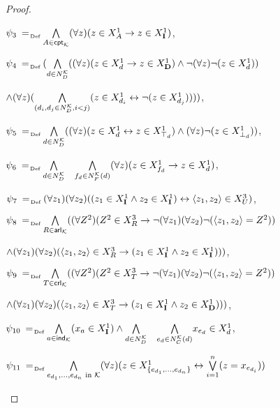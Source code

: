 \documentclass[a4paper]{llncs}
\newcommand{\defAs}{\mathrel{\makebox{\:= \hspace{-.2cm} \raisebox{-0.5 ex}[0 ex][0 ex]{\tiny Def}}}}
\newcommand{\I}{\mathbf{I}}
\newcommand{\D}{\mathbf{D}}
\newcommand{\ck}{\mathsf{cpt}_\mathcal{K}}
\newcommand{\ark}{\mathsf{arl}_\mathcal{K}}
\newcommand{\crk}{\mathsf{crl}_\mathcal{K}}
\newcommand{\ik}{\mathsf{ind}_\mathcal{K}}
\begin{document}
\begin{proof}
\begin{itemize}
{\item[-] $\psi_3 \defAs \underset{A \in \ck}\bigwedge (\forall z)(z \in X_{A}^1 \rightarrow z \in X_{\I}^1)$,

\item[-] $\psi_4 \defAs ( \underset{d \in N_{D}^\mathcal{K}}\bigwedge((\forall z)(z \in X_{d}^1 \rightarrow z \in X_{\D}^1) \wedge \neg (\forall z)\neg(z \in X_{d}^1))$

$\hfill \wedge (\forall z) (\underset{(d_i,d_j \in N_{D}^\mathcal{K}, i < j)}\bigwedge (z \in X_{d_i}^1 \leftrightarrow \neg (z \in X_{d_j}^1))))$,

\item[-] $\psi_5 \defAs \underset{d \in N_{D}^\mathcal{K}}\bigwedge((\forall z)(z \in X_{d}^1 \leftrightarrow z \in X_{\top_d}^1) \wedge (\forall z)\neg(z \in X_{\bot_d}^1))$,

\item[-] $\psi_6 \defAs \underset{d \in N_{D}^\mathcal{K}} \bigwedge  \quad \underset {f_d \in N_{F}^\mathcal{K}(d)}\bigwedge (\forall z)(z \in X_{f_d}^1 \rightarrow z \in X_{d}^1)$,

\item[-] $\psi_7 \defAs (\forall z_1)(\forall z_2)((z_1 \in X_{\I}^1 \wedge z_2 \in X_{\I}^1) \leftrightarrow \langle z_1,z_2 \rangle \in X_{U}^3)$,

\item[-] $\psi_8 \defAs  \underset {R \in \ark} \bigwedge((\forall Z^2)(Z^2 \in X_R^3 \rightarrow \neg (\forall z_1)(\forall z_2) \neg (\langle z_1,z_2\rangle = Z^2))$

$\hfill \wedge (\forall z_1)(\forall z_2)(\langle z_1,z_2\rangle \in X_R^3 \rightarrow (z_1 \in X_{\I}^1 \wedge z_2 \in X_{\I}^1)))$,

\item[-] $\psi_9 \defAs \underset{T \in \crk} \bigwedge ((\forall Z^2)(Z^2 \in X_T^3 \rightarrow \neg (\forall z_1)(\forall z_2) \neg (\langle z_1,z_2\rangle = Z^2))$

$\hfill \wedge (\forall z_1)(\forall z_2)(\langle z_1,z_2\rangle \in X_T^3 \rightarrow (z_1 \in X_{\I}^1 \wedge z_2 \in X_{\D}^1)))$,

\item[-] $\psi_{10} \defAs \underset{a \in \ik} \bigwedge(x_a \in X_{\I}^1) \wedge \underset {d \in N_{D}^\mathcal{K}} \bigwedge \quad \underset {e_d \in N_{C}^\mathcal{K}(d)} \bigwedge x_{e_d} \in X_{d}^1$,

\item[-] $\psi_{11} \defAs \underset {e_{d_1},\ldots, e_{d_n} \textrm{ in } \mathcal{K}} \bigwedge (\forall z)(z \in X_{\{e_{d_1},\ldots, e_{d_n}\}}^1\leftrightarrow \overset{n}  { \underset {i=1} \bigvee }(z = x_{e_{d_i}}))$

}
\end{itemize}
\end{proof}
\end{document}
